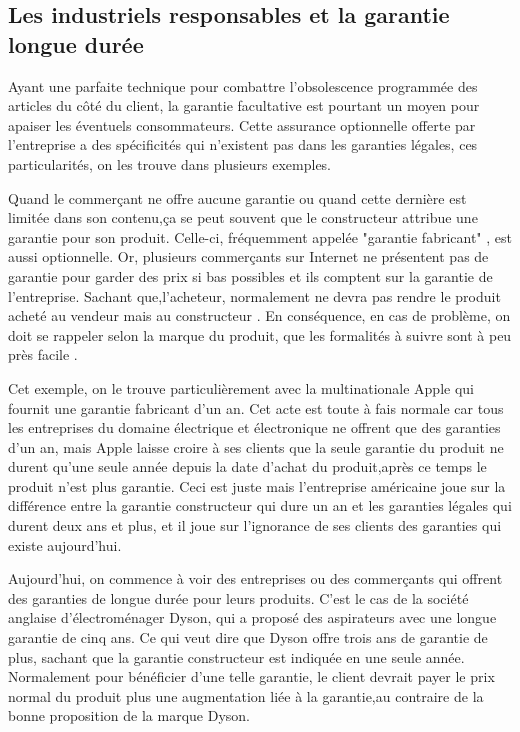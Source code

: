 \subsection{Les industriels responsables et la garantie longue durée}

Ayant une parfaite technique pour combattre l’obsolescence programmée des articles du côté du client, la garantie facultative est pourtant un moyen pour apaiser les éventuels consommateurs. Cette assurance optionnelle offerte par l'entreprise a des  spécificités qui n'existent pas dans les garanties légales, ces particularités, on les trouve dans plusieurs exemples.
 
Quand le commerçant ne offre aucune garantie ou quand cette dernière est limitée dans son contenu,ça se peut souvent que le constructeur attribue une garantie pour son produit. Celle-ci, fréquemment appelée "garantie fabricant" , est aussi optionnelle.
 Or, plusieurs commerçants sur Internet ne présentent pas de garantie pour  garder des prix si bas  possibles et ils comptent sur la garantie de l'entreprise. Sachant que,l'acheteur, normalement ne devra pas rendre le produit acheté au vendeur mais au constructeur . En conséquence, en cas de problème, on doit se rappeler selon la marque du produit, que les formalités à suivre sont à peu près facile .

Cet exemple, on le trouve particulièrement avec la multinationale Apple qui fournit une garantie fabricant d’un an. Cet acte est toute à fais normale car tous les entreprises du domaine électrique et électronique ne offrent que des garanties d’un an, mais Apple laisse croire à ses clients que la seule garantie du produit ne durent qu'une seule année depuis la date d'achat du produit,après ce temps le produit n'est plus garantie. Ceci est juste mais l'entreprise américaine joue sur la différence entre la garantie constructeur qui dure un an et les garanties légales qui durent deux ans et plus, et il joue sur l'ignorance de ses clients des garanties qui existe aujourd'hui.

Aujourd'hui, on commence à voir des entreprises ou des commerçants qui offrent des garanties de longue durée pour leurs produits.
 C'est le cas de la société anglaise d’électroménager Dyson, qui a proposé des aspirateurs avec une longue garantie de cinq ans. Ce qui veut dire que Dyson offre trois ans de garantie de plus, sachant que la garantie constructeur est indiquée en une seule année. Normalement pour bénéficier d'une telle garantie, le client devrait payer le prix normal du produit plus une augmentation liée à la garantie,au contraire de la bonne proposition de la marque Dyson. 


